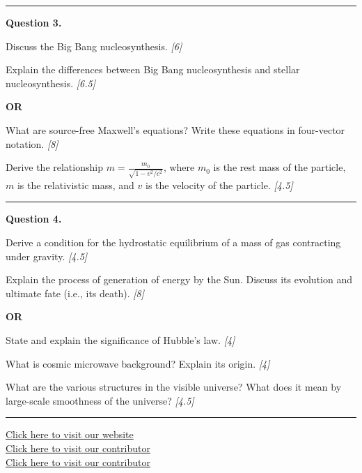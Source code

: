 \documentclass[11pt,a4paper]{article}
\newcommand{\pts}[1]{\hfill   \textit{[#1]}}
\begin{document}
\medskip\rule{\linewidth}{0.2pt}




\noindent   \textbf{Question 3.}

\begin{parts}
  \item Discuss the Big Bang nucleosynthesis. \pts{6}
  \item Explain the differences between Big Bang nucleosynthesis and stellar nucleosynthesis. \pts{6.5}
\end{parts}
\hfill   \textbf{OR}

\begin{parts}
  \item What are source-free Maxwell's equations? Write these equations in four-vector notation. \pts{8}
  \item Derive the relationship $m = \frac{m_0}{\sqrt{1 - v^2/c^2}}$, where $m_0$ is the rest mass of the particle, $m$ is the relativistic mass, and $v$ is the velocity of the particle. \pts{4.5}
\end{parts}

\medskip\rule{\linewidth}{0.2pt}




\noindent   \textbf{Question 4.}

\begin{parts}
  \item Derive a condition for the hydrostatic equilibrium of a mass of gas contracting under gravity. \pts{4.5}
  \item Explain the process of generation of energy by the Sun. Discuss its evolution and ultimate fate (i.e., its death). \pts{8}
\end{parts}
\hfill   \textbf{OR}

\begin{parts}
  \item State and explain the significance of Hubble's law. \pts{4}
  \item What is cosmic microwave background? Explain its origin. \pts{4}
  \item What are the various structures in the visible universe? What does it mean by large-scale smoothness of the universe? \pts{4.5}
\end{parts}

\vfill
\rule{\linewidth}{0.4pt}

\begin{center}\small
  \href{https://bhu-exam.vercel.app/}{Click here to visit our website}\\[4pt]
  \href{https://me-aryan.vercel.app/}{Click here to visit our contributor}\\[4pt]
  \href{https://quashan-me.vercel.app/}{Click here to visit our contributor}
\end{center}
\end{document}
